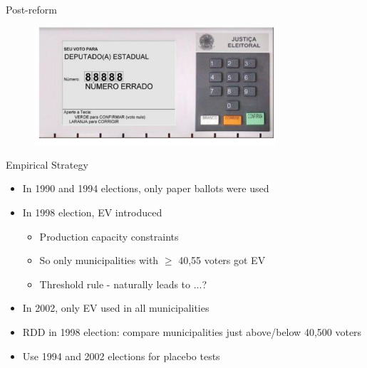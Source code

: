 \documentclass[11pt,notes=hide,aspectratio=169,mathserif]{beamer}
\begin{document}
\begin{frame}{Post-reform}
\begin{figure}
\centering
\includegraphics[width=0.8\textwidth]{inputs/fig4.png}
\end{figure}
\end{frame}

\begin{frame}{Empirical Strategy}

\begin{itemize}
\item In 1990 and 1994 elections, only paper ballots were used
\item In 1998 election, EV introduced 
\begin{itemize}
    \item Production capacity constraints 
    \item So only municipalities with $\geq$ 40,55 voters got EV 
    \item Threshold rule - naturally leads to ...?
\end{itemize}
\item In 2002, only EV used in all municipalities
\pause \item RDD in 1998 election: compare municipalities just above/below 40,500 voters
\pause \item Use 1994 and 2002 elections for placebo tests 
\end{itemize}
\end{frame}
\end{document}
